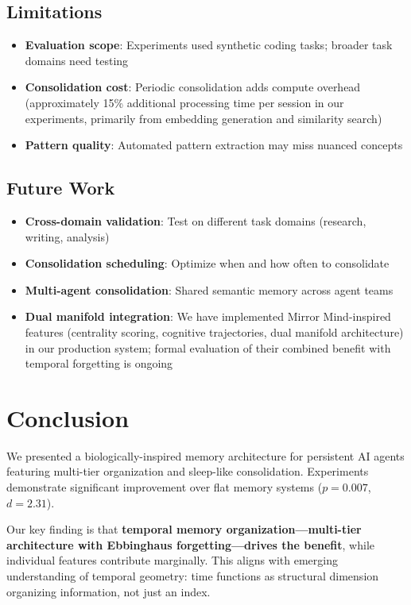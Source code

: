 \documentclass[11pt]{article}
\begin{document}
\subsection{Limitations}

\begin{itemize}
    \item \textbf{Evaluation scope}: Experiments used synthetic coding tasks; broader task domains need testing
    \item \textbf{Consolidation cost}: Periodic consolidation adds compute overhead (approximately 15\% additional processing time per session in our experiments, primarily from embedding generation and similarity search)
    \item \textbf{Pattern quality}: Automated pattern extraction may miss nuanced concepts
\end{itemize}

\subsection{Future Work}

\begin{itemize}
    \item \textbf{Cross-domain validation}: Test on different task domains (research, writing, analysis)
    \item \textbf{Consolidation scheduling}: Optimize when and how often to consolidate
    \item \textbf{Multi-agent consolidation}: Shared semantic memory across agent teams
    \item \textbf{Dual manifold integration}: We have implemented Mirror Mind-inspired features (centrality scoring, cognitive trajectories, dual manifold architecture) in our production system; formal evaluation of their combined benefit with temporal forgetting is ongoing
\end{itemize}

\section{Conclusion}

We presented a biologically-inspired memory architecture for persistent AI agents featuring multi-tier organization and sleep-like consolidation. Experiments demonstrate significant improvement over flat memory systems ($p=0.007$, $d=2.31$).

Our key finding is that \textbf{temporal memory organization---multi-tier architecture with Ebbinghaus forgetting---drives the benefit}, while individual features contribute marginally. This aligns with emerging understanding of temporal geometry: time functions as structural dimension organizing information, not just an index.
\end{document}
